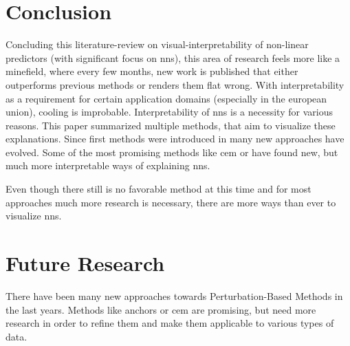 \section{Conclusion}
Concluding this literature-review on visual-interpretability of non-linear predictors (with significant focus on \glspl{nn}), this area of research feels more like a minefield, where every few months, new work is published that either outperforms previous methods or renders them flat wrong. With interpretability as a requirement for certain application domains (especially in the european union), cooling is improbable. Interpretability of \glspl{nn} is a necessity for various reasons. This paper summarized multiple methods, that aim to visualize these explanations. Since first methods were introduced in \cite{RobnikSikonja.2008} many new approaches have evolved. Some of the most promising methods like \gls{cem} or  have found new, but much more interpretable ways of explaining \glspl{nn}. 
\par
Even though there still is no favorable method at this time and for most approaches much more research is necessary, there are more ways than ever to visualize \glspl{nn}.

\section{Future Research}
There have been many new approaches towards Perturbation-Based Methods in the last years. Methods like anchors or \gls{cem} are promising, but need more research in order to refine them and make them applicable to various types of data. 
